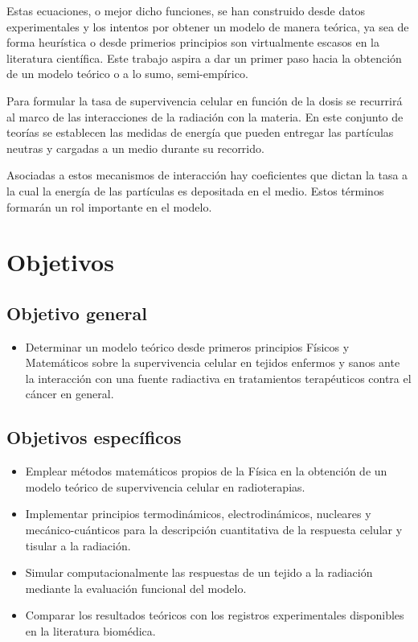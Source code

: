 \documentclass[12pt,letterpaper, oneside]{book}
\begin{document}
	Estas ecuaciones, o mejor dicho funciones, se han construido desde datos experimentales y los intentos por obtener un modelo de manera teórica, ya sea de forma heurística o desde primerios principios son virtualmente escasos en la literatura científica. Este trabajo aspira a dar un primer paso hacia la obtención de un modelo teórico o a lo sumo, semi-empírico. 
	
	Para formular la tasa de supervivencia celular en función de la dosis se recurrirá al marco de las interacciones de la radiación con la materia. En este conjunto de teorías se establecen las medidas de energía que pueden entregar las partículas neutras y cargadas a un medio durante su recorrido.
	
	Asociadas a estos mecanismos de interacción hay coeficientes que dictan la tasa a la cual la energía de las partículas es depositada en el medio. Estos términos formarán un rol importante en el modelo. 
	
	\chapter*{Objetivos}
	
	\section*{Objetivo general}
	\begin{itemize}
		\item Determinar un modelo teórico desde primeros principios Físicos y Matemáticos sobre la supervivencia celular en tejidos enfermos y sanos ante la interacción con una fuente radiactiva en tratamientos terapéuticos contra el cáncer en general.
	\end{itemize}
	\section*{Objetivos específicos}
	\begin{itemize}
		\item Emplear métodos matemáticos propios de la Física en la obtención de un modelo teórico de supervivencia celular en radioterapias. 
		\item Implementar principios termodinámicos, electrodinámicos, nucleares y mecánico-cuánticos para la descripción cuantitativa de la respuesta celular y tisular a la radiación. 
		\item Simular computacionalmente las respuestas de un tejido a la radiación mediante la evaluación funcional del modelo. 
		\item Comparar los resultados teóricos con los registros experimentales disponibles en la literatura biomédica. 
	\end{itemize}
	
\end{document}
